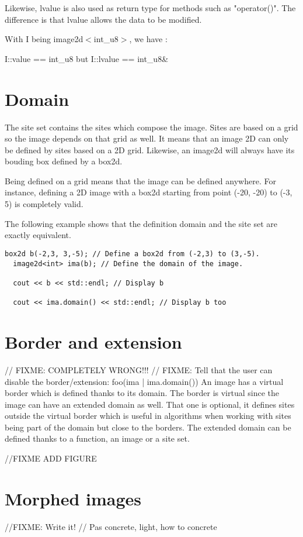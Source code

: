 \documentclass{report}
\begin{document}
Likewise, lvalue is also used as return type for methods such as "operator()".
The difference is that lvalue allows the data to be modified.

With I being image2d$<$int\_u8$>$, we have :

\begin{center}
    I::value == int\_u8  but  I::lvalue == int\_u8\&
\end{center}

\section{Domain}
The site set contains the sites which compose the image. Sites are based on a
grid so the image depends on that grid as well. 
It means that an image 2D can only be defined by sites based on a 2D grid.
Likewise, an image2d will always have its bouding box defined by a box2d.

Being defined on a grid means that the image can be defined anywhere.
For instance, defining a 2D image with a box2d starting from point (-20, -20)
  to (-3, 5) is completely valid.

The following example shows that the definition domain and the site set are
exactly equivalent.

\begin{lstlisting}[frame=single]
  box2d b(-2,3, 3,-5); // Define a box2d from (-2,3) to (3,-5).
  image2d<int> ima(b); // Define the domain of the image.

  cout << b << std::endl; // Display b

  cout << ima.domain() << std::endl; // Display b too
\end{lstlisting}


\section{Border and extension}
// FIXME: COMPLETELY WRONG!!!
// FIXME: Tell that the user can disable the border/extension: foo(ima | ima.domain())
An image has a virtual border which is defined thanks to its domain. The
 border is virtual since the image can have an extended domain as well.
That one is optional, it defines sites outside the virtual border which is
useful in algorithms when working with sites being part of the domain but close
to the borders. The extended domain can be defined thanks to a function, an
image or a site set.

//FIXME ADD FIGURE

\section{Morphed images}
//FIXME: Write it!
// Pas concrete, light, how to concrete
\end{document}
